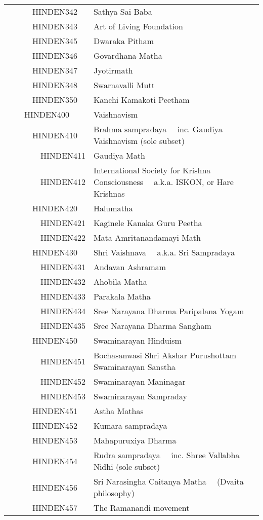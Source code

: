 \documentclass[12pt]{article}
\begin{document}
\begin{tiny}
\begin{center}
\begin{longtable}{|l|l|}
~~~~~~HINDEN342 & Sathya Sai Baba \\
~~~~~~HINDEN343 & Art of Living Foundation \\
~~~~~~HINDEN345 & Dwaraka Pitham \\
~~~~~~HINDEN346 & Govardhana Matha \\
~~~~~~HINDEN347 & Jyotirmath \\
~~~~~~HINDEN348 & Swarnavalli Mutt \\
~~~~~~HINDEN350 & Kanchi Kamakoti Peetham \\
~~~~HINDEN400 & Vaishnavism \\
~~~~~~HINDEN410 & Brahma sampradaya	~~inc. Gaudiya Vaishnavism (sole subset) \\
~~~~~~~~HINDEN411 & Gaudiya Math \\
~~~~~~~~HINDEN412 & International Society for Krishna Consciousness	~~a.k.a. ISKON, or Hare Krishnas \\
~~~~~~HINDEN420 & Halumatha \\
~~~~~~~~HINDEN421 & Kaginele Kanaka Guru Peetha \\
~~~~~~~~HINDEN422 & Mata Amritanandamayi Math \\
~~~~~~HINDEN430 & Shri Vaishnava	~~a.k.a. Sri Sampradaya \\
~~~~~~~~HINDEN431 & Andavan Ashramam \\
~~~~~~~~HINDEN432 & Ahobila Matha \\
~~~~~~~~HINDEN433 & Parakala Matha \\
~~~~~~~~HINDEN434 & Sree Narayana Dharma Paripalana Yogam \\
~~~~~~~~HINDEN435 & Sree Narayana Dharma Sangham \\
~~~~~~HINDEN450 & Swaminarayan Hinduism \\
~~~~~~~~HINDEN451 & Bochasanwasi Shri Akshar Purushottam Swaminarayan Sanstha \\
~~~~~~~~HINDEN452 & Swaminarayan Maninagar \\
~~~~~~~~HINDEN453 & Swaminarayan Sampraday \\
~~~~~~HINDEN451 & Astha Mathas \\
~~~~~~HINDEN452 & Kumara sampradaya \\
~~~~~~HINDEN453 & Mahapuruxiya Dharma \\
~~~~~~HINDEN454 & Rudra sampradaya	~~inc. Shree Vallabha Nidhi  (sole subset) \\
~~~~~~HINDEN456 & Sri Narasingha Caitanya Matha	~~(Dvaita philosophy) \\
~~~~~~HINDEN457 & The Ramanandi movement \\

\end{longtable}
\end{center}
\end{tiny}
\end{document}
